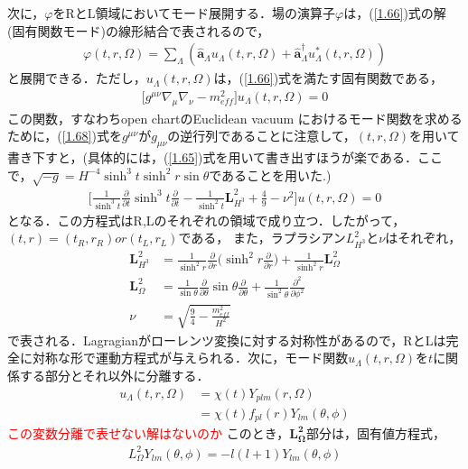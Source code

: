 次に，$\varphi$をRとL領域においてモード展開する．場の演算子$\varphi$は，(\ref{1.66})式の解(固有関数モード)の線形結合で表されるので，
\begin{align}
  \varphi(t,r,\Omega)=\sum_{\Lambda}(\hat{\bm{a}}_{\Lambda}u_{\Lambda}(t,r,\Omega)+\hat{\bm{a}}^{\dagger}_{\Lambda}u^{*}_{\Lambda}(t,r,\Omega))
\end{align}
と展開できる．ただし，$u_{\Lambda}(t,r,\Omega)$は，(\ref{1.66})式を満たす固有関数である，
\begin{align}
  \label{1.68}
\biggl[g^{\mu\nu}\nabla_{\mu}\nabla_{\nu}-m_{eff}^2\biggr]u_{\Lambda}(t,r,\Omega)=0
\end{align}
この関数，すなわちopen chartのEuclidean vacuum におけるモード関数を求めるために，(\ref{1.68})式を$g^{\mu\nu}$が$g_{\mu\nu}$の逆行列であることに注意して，$(t,r,\Omega)$を用いて書き下すと，(具体的には，(\ref{1.65})式を用いて書き出すほうが楽である．ここで，$\sqrt{-g}=H^{-4}\sinh^3t\sinh^2r\sin\theta$であることを用いた.)
\begin{align}
  \biggl[\frac{1}{\sinh^3t}\frac{\partial}{\partial t}\sinh^3t\frac{\partial}{\partial t}-\frac{1}{\sinh^2t}\bm{L}^2_{H^3}+\frac{4}{9}-\nu^2\biggr]u(t,r,\Omega)=0
\end{align}
となる．この方程式はR,Lのそれぞれの領域で成り立つ．したがって，$(t,r)=(t_{R},r_{R}) or (t_{L},r_{L})$である，
また，ラプラシアン$L_{H^3}^2$と$\nu$はそれぞれ，
\begin{align}
  \bm{L}_{H^3}^2&=\frac{1}{\sinh^2r}\frac{\partial}{\partial r}\biggl(\sinh^2r\frac{\partial}{\partial r}\biggr)+\frac{1}{\sinh^2r}\bm{L}_{\Omega}^2 \\
  \bm{L}_{\Omega}^2&=\frac{1}{\sin\theta}\frac{\partial}{\partial \theta}\sin{\theta}\frac{\partial}{\partial \theta}+\frac{1}{\sin^2{\theta}}
  \frac{\partial^2}{\partial \phi^2} \\
  \nu&=\sqrt{\frac{9}{4}-\frac{m^2_{eff}}{H^{2}}}
\end{align}
で表される．Lagragianがローレンツ変換に対する対称性があるので，RとLは完全に対称な形で運動方程式が与えられる．次に，モード関数$u_{\Lambda}(t,r,\Omega)$を$t$に関係する部分とそれ以外に分離する．
\begin{align}
  u_{\Lambda}(t,r,\Omega)&=\chi(t)Y_{plm}(r,\Omega)\\
  &=\chi(t)f_{pl}(r)Y_{lm}(\theta,\phi)
 \end{align}
 \textcolor{red}{この変数分離で表せない解はないのか}
このとき，$\bm{L_{\Omega}^2}$部分は，固有値方程式，
\begin{align}
  L_{\Omega}^2Y_{lm}(\theta,\phi)=-l(l+1)Y_{lm}(\theta,\phi)
\end{align}
